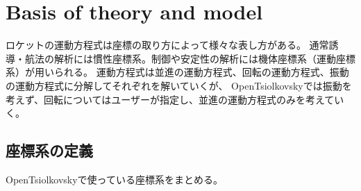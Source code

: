 \documentclass[12pt]{jsarticle}
\begin{document}
\section{Basis of theory and model}

ロケットの運動方程式は座標の取り方によって様々な表し方がある。
通常誘導・航法の解析には慣性座標系。制御や安定性の解析には機体座標系（運動座標系）が用いられる。
運動方程式は並進の運動方程式、回転の運動方程式、振動の運動方程式に分解してそれぞれを解いていくが、
OpenTsiolkovskyでは振動を考えず、回転についてはユーザーが指定し、並進の運動方程式のみを考えていく。

\subsection{座標系の定義}

OpenTsiolkovskyで使っている座標系をまとめる。
\end{document}
